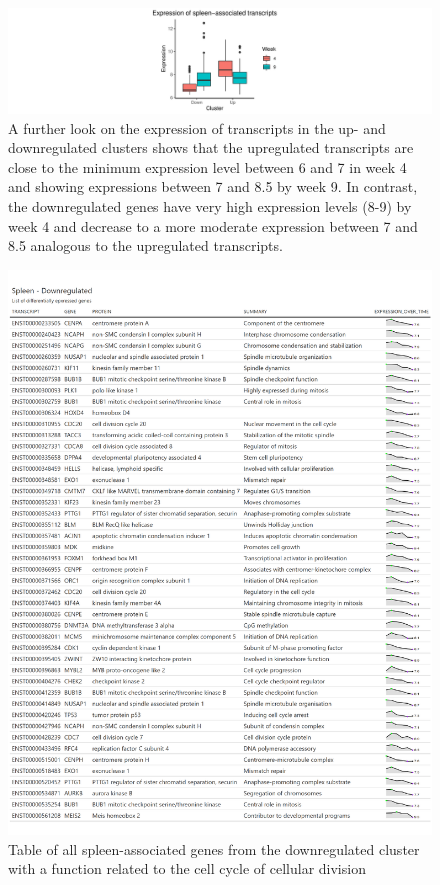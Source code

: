 \documentclass[
]{article}
\begin{document}
\begin{figure}
\centering
\includegraphics{final_report_files/figure-latex/spleen-boxplot-1.pdf}
\caption{\label{fig:spleen-boxplot}A further look on the expression of transcripts in the up- and downregulated clusters shows that the upregulated transcripts are close to the minimum expression level between 6 and 7 in week 4 and showing expressions between 7 and 8.5 by week 9. In contrast, the downregulated genes have very high expression levels (8-9) by week 4 and decrease to a more moderate expression between 7 and 8.5 analogous to the upregulated transcripts.}
\end{figure}

\begin{figure}
\centering
\includegraphics{final_report_files/figure-latex/spleen-down-table-1.pdf}
\caption{\label{fig:spleen-down-table}Table of all spleen-associated genes from the downregulated cluster with a function related to the cell cycle of cellular division}
\end{figure}
\end{document}
